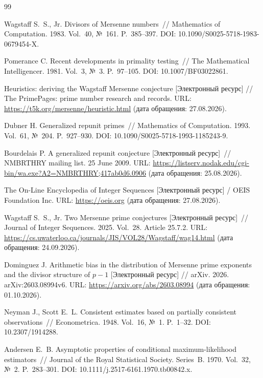 \documentclass[11pt,a4paper]{article}
\theoremstyle{plain}
\theoremstyle{remark}
\begin{document}
\renewcommand{\refname}{Список источников}
\begin{thebibliography}{99}

 Wagstaff S.~S., Jr. Divisors of Mersenne numbers~//
Mathematics of Computation. 1983. Vol.~40, №~161. P.~385--397.
DOI: 10.1090/S0025-5718-1983-0679454-X.

 Pomerance C. Recent developments in primality testing~//
The Mathematical Intelligencer. 1981. Vol.~3, №~3. P.~97--105.
DOI: 10.1007/BF03022861.

 Heuristics: deriving the Wagstaff Mersenne conjecture
[Электронный ресурс] // The PrimePages: prime number research and records.
URL: \url{https://t5k.org/mersenne/heuristic.html} (дата обращения: 27.08.2026).

 Dubner H. Generalized repunit primes~//
Mathematics of Computation. 1993. Vol.~61, №~204. P.~927--930.
DOI: 10.1090/S0025-5718-1993-1185243-9.

 Bourdelais P. A generalized repunit conjecture
[Электронный ресурс]~// NMBRTHRY mailing list. 25 June 2009.
URL: \url{https://listserv.nodak.edu/cgi-bin/wa.exe?A2=NMBRTHRY;417ab0d6.0906}
(дата обращения: 25.08.2026).

 The On-Line Encyclopedia of Integer Sequences
[Электронный ресурс] / OEIS Foundation Inc.
URL: \url{https://oeis.org} (дата обращения: 27.08.2026).

 Wagstaff S.~S., Jr. Two Mersenne prime conjectures
[Электронный ресурс]~// Journal of Integer Sequences. 2025. Vol.~28.
Article 25.7.2.
URL: \url{https://cs.uwaterloo.ca/journals/JIS/VOL28/Wagstaff/wag14.html}
(дата обращения: 24.09.2026).

 Dominguez J. Arithmetic bias in the distribution of Mersenne
prime exponents and the divisor structure of $p-1$ [Электронный ресурс] // arXiv.
2026. arXiv:2603.08994v6. URL: \url{https://arxiv.org/abs/2603.08994}
(дата обращения: 01.10.2026).

 Neyman J., Scott E.~L. Consistent estimates based on
partially consistent observations~// Econometrica. 1948. Vol.~16, №~1. P.~1--32.
DOI: 10.2307/1914288.

 Andersen E.~B. Asymptotic properties of conditional
maximum-likelihood estimators~// Journal of the Royal Statistical Society.
Series~B. 1970. Vol.~32, №~2. P.~283--301.
DOI: 10.1111/j.2517-6161.1970.tb00842.x.


\end{thebibliography}
\end{document}
